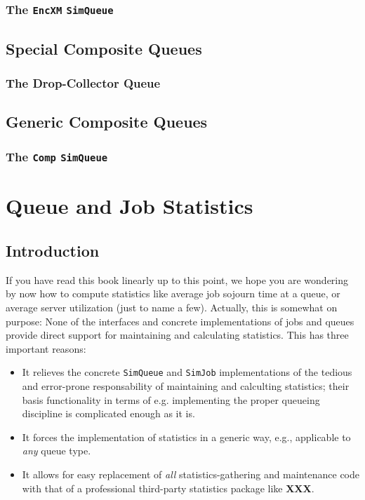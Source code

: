 \documentclass[12pt]{book}
\begin{document}
\subsection{The \lstinline{EncXM} \lstinline{SimQueue}}

\section{Special Composite Queues}

\subsection{The Drop-Collector Queue}

\section{Generic Composite Queues}

\subsection{The \lstinline{Comp} \lstinline{SimQueue}}

\chapter{Queue and Job Statistics}

\section{Introduction}
\label{stat-intro}

If you have read this book linearly up to this point,
  we hope you are wondering by now how to compute
  statistics like average job sojourn time at a queue,
  or average server utilization (just to name a few).
Actually, this is somewhat on purpose: None of the
  interfaces and concrete implementations
  of jobs and queues
  provide direct support for maintaining and calculating statistics.
This has three important reasons:
\begin{itemize}
\item It relieves the concrete \lstinline|SimQueue|
        and \lstinline|SimJob| implementations of the
        tedious and error-prone responsability of
        maintaining and calculting statistics;
        their basis functionality in terms of
        e.g. implementing the proper queueing discipline is
        complicated enough as it is.
\item It forces the implementation of statistics in a generic way,
      e.g., applicable to {\em any\/} queue type.
\item It allows for easy replacement of {\em all\/} statistics-gathering
        and maintenance code with that of a professional
        third-party statistics package like {\bf XXX}.
\end{itemize}
\end{document}
